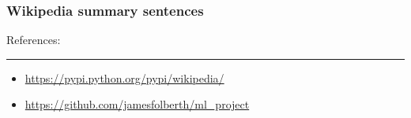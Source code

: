 \documentclass{article}
\newcommand{\problemline}{\rule{\textwidth}{0.25mm}}
\theoremstyle{mystuff}
\theoremstyle{myexample}
\theoremstyle{named}
\begin{document}
\subsubsection{Wikipedia summary sentences}




\label{ssec:log_reg}



References:\\
\problemline
\begin{itemize}
   \item \url{https://pypi.python.org/pypi/wikipedia/}
   \item \url{https://github.com/jamesfolberth/ml_project}
\end{itemize}

%
%
\end{document}
